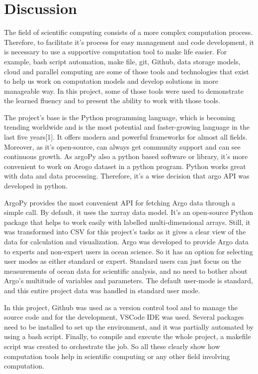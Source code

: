 \section{Discussion}

The field of scientific computing consists of a more complex computation process. Therefore, to facilitate it’s process for easy management and code development, it is necessary to use a supportive computation tool to make life easier. For example, bash script automation, make file, git, Github, data storage models, cloud and parallel computing are some of those tools and technologies that exist to help us work on computation models and develop solutions in more manageable way. In this project, some of those tools were used to demonstrate the learned fluency and to present the ability to work with those tools. \newline 

\noindent The project's base is the Python programming language, which is becoming trending worldwide and is the most potential and faster-growing language in the last five years[1]. It offers modern and powerful frameworks for almost all fields. Moreover, as it’s open-source, can always get community support and can see continuous growth. As argoPy also a python based software or library, it’s more convenient to work on Arogo dataset in a python program. Python works great with data and data processing. Therefore, it’s a wise decision that argo API was developed in python. \newline

\noindent ArgoPy provides the most convenient API for fetching Argo data through a simple call. By default, it uses the xarray data model. It’s an open-source Python package that helps to work easily with labelled multi-dimensional arrays. Still, it was transformed into CSV for this project's tasks as it gives a clear view of the data for calculation and visualization. Argo was developed to provide Argo data to experts and non-expert users in ocean science. So it has an option for selecting user modes as either standard or expert. Standard users can just focus on the measurements of ocean data for scientific analysis, and no need to bother about Argo's multitude of variables and parameters. The default user-mode is standard, and this entire project data was handled in standard user mode. \newline

\noindent In this project, Github was used as a version control tool and to manage the source code and for the development, VSCode IDE was used. Several packages need to be installed to set up the environment, and it was partially automated by using a bash script. Finally, to compile and execute the whole project, a makefile script was created to orchestrate the job. So all these clearly show how computation tools help in scientific computing or any other field involving computation. \newline
\newpage
